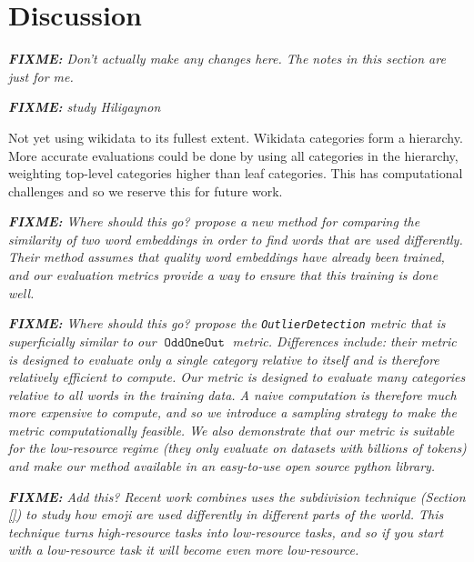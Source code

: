 \documentclass[11pt,a4paper]{article}
\DeclareMathOperator{\OddOneOut}{\texttt{OddOneOut}}
\newcommand{\fixme}[1]{{\color{red}\itshape \textbf{FIXME:} {#1}}}
\begin{document}
\section{Discussion}
\label{sec:discussion}

\fixme{
Don't actually make any changes here.
The notes in this section are just for me.
}

\fixme{
    \citet{michel-etal-2020-exploring} study Hiligaynon
}

Not yet using wikidata to its fullest extent.
Wikidata categories form a hierarchy.
More accurate evaluations could be done by using all categories in the hierarchy,
weighting top-level categories higher than leaf categories.
This has computational challenges and so we reserve this for future work.

\fixme{Where should this go?
\citet{gonen2020simple} propose a new method for comparing the similarity of two word embeddings in order to find words that are used differently.
Their method assumes that quality word embeddings have already been trained,
and our evaluation metrics provide a way to ensure that this training is done well.
}

\fixme{Where should this go?
\citet{camacho-collados-navigli-2016-find} propose the \texttt{OutlierDetection} metric that is superficially similar to our $\OddOneOut$ metric.
Differences include: their metric is designed to evaluate only a single category relative to itself and is therefore relatively efficient to compute.
Our metric is designed to evaluate many categories relative to all words in the training data.
A naive computation is therefore much more expensive to compute,
and so we introduce a sampling strategy to make the metric computationally feasible.
We also demonstrate that our metric is suitable for the low-resource regime (they only evaluate on datasets with billions of tokens) and make our method available in an easy-to-use open source python library.
}

\fixme{Add this?
Recent work \citet{guntuku2019studying} combines uses the subdivision technique (Section \ref{}) to study how emoji are used differently in different parts of the world.
This technique turns high-resource tasks into low-resource tasks,
and so if you start with a low-resource task it will become even more low-resource.
}
\end{document}
